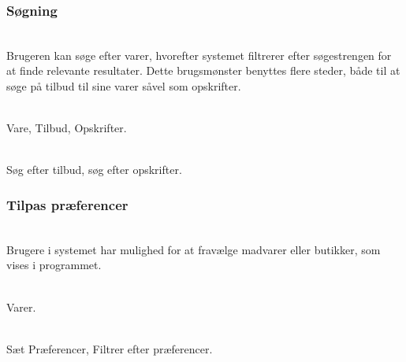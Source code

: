 \subsubsection{Søgning}
\begin{description}[font=\normalfont\itshape]
\item[Brugsmønster]\hfill\\
Brugeren kan søge efter varer, hvorefter systemet filtrerer efter søgestrengen for at finde relevante resultater.
Dette brugsmønster benyttes flere steder, både til at søge på tilbud til sine varer såvel som opskrifter.
\item[Objekter]\hfill\\
Vare, Tilbud, Opskrifter.
\item[Funktioner]\hfill\\
Søg efter tilbud, søg efter opskrifter.
\end{description}

\subsubsection{Tilpas præferencer}
\begin{description}[font=\normalfont\itshape]
\item[Brugsmønster]\hfill\\
Brugere i systemet har mulighed for at fravælge madvarer eller butikker, som vises i programmet.
\item[Objekter]\hfill\\
Varer.
\item[Funktioner]\hfill\\
Sæt Præferencer, Filtrer efter præferencer.
\end{description}

